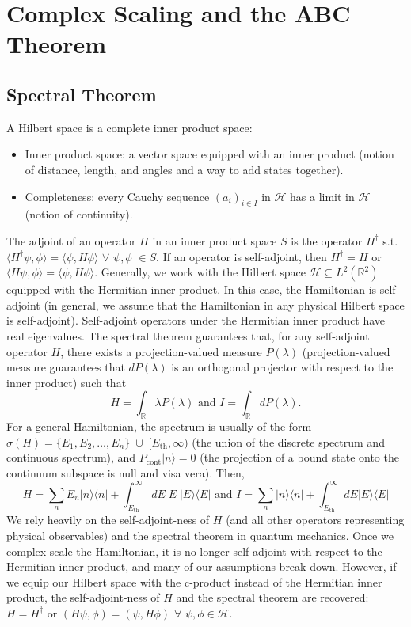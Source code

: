 \section{Complex Scaling and the ABC Theorem}
\subsection{Spectral Theorem}
A Hilbert space is a complete inner product space:
\begin{itemize}
    \item Inner product space: a vector space equipped with an inner product (notion of distance, length, and angles and a way to add states together).
    \item Completeness: every Cauchy sequence $(a_i)_{i\in I}$ in $\mathcal{H}$ has a limit in $\mathcal{H}$ (notion of continuity).
\end{itemize}
The adjoint of an operator $H$ in an inner product space $S$ is the operator $H^\dagger$ s.t. $\langle H^\dagger \psi, \phi\rangle = \langle \psi, H\phi\rangle$ $\forall$ $\psi, \phi$ $\in S$. If an operator is self-adjoint, then $H^\dagger=H$ or $\langle H \psi, \phi\rangle = \langle \psi, H\phi\rangle$. Generally, we work with the Hilbert space $\mathcal{H}\subseteq L^2(\mathbb{R}^2)$ equipped with the Hermitian inner product. In this case, the Hamiltonian is self-adjoint (in general, we assume that the Hamiltonian in any physical Hilbert space is self-adjoint). Self-adjoint operators under the Hermitian inner product have real eigenvalues. The spectral theorem guarantees that, for any self-adjoint operator $H$, there exists a projection-valued measure $P(\lambda)$ (projection-valued measure guarantees that $dP(\lambda)$ is an orthogonal projector with respect to the inner product) such that
\[
    H = \int_\mathbb{R} \lambda P(\lambda) \text{ and } I = \int_\mathbb{R} dP(\lambda).
\]
For a general Hamiltonian, the spectrum is usually of the form $\sigma(H) = \{E_1, E_2, \dots, E_n\}\;\cup\; [E_\text{th},\infty)$ (the union of the discrete spectrum and continuous spectrum), and $P_\text{cont}|n\rangle = 0$ (the projection of a bound state onto the continuum subspace is null and visa vera). Then,
\[
    H = \sum_n E_n |n\rangle\langle n| + \int_{E_\text{th}}^\infty \; dE\;E\; |E\rangle\langle E| \text{ and } I = \sum_n |n\rangle\langle n| + \int_{E_\text{th}}^\infty dE |E\rangle \langle E|
\]
We rely heavily on the self-adjoint-ness of $H$ (and all other operators representing physical observables) and the spectral theorem in quantum mechanics. Once we complex scale the Hamiltonian, it is no longer self-adjoint with respect to the Hermitian inner product, and many of our assumptions break down. However, if we equip our Hilbert space with the c-product instead of the Hermitian inner product, the self-adjoint-ness of $H$ and the spectral theorem are recovered: $H=H^\dagger$ or $(H\psi, \phi) = (\psi, H\phi)$ $\forall$ $\psi, \phi\in \mathcal{H}$.

